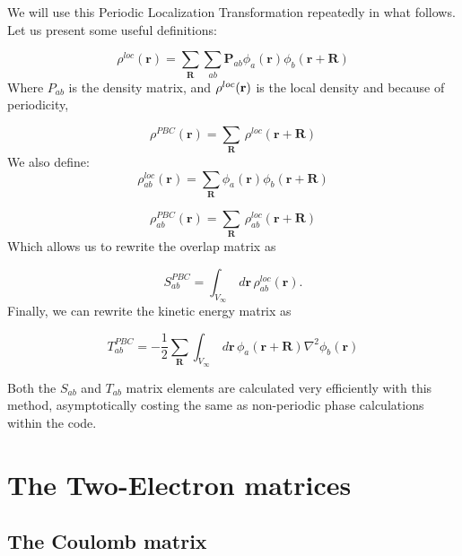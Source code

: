 \commentoutA{\documentclass[prb,aps,twocolumn,showpacs,twocolumngrid,superbib]{revtex4}}
\begin{document}
We will use this Periodic Localization Transformation repeatedly
in what follows. Let us present some useful definitions:

\begin{equation}
\label{rho_loc}
\rho ^{loc}({\mathbf{r}})=\sum _{\mathbf{R}}\sum _{ab}{\mathbf{P}}_{ab}\phi _{a}
({\mathbf{r}})\phi _{b}({\mathbf{r}+\mathbf{R}})
\end{equation}
Where $P_{ab}$ is the density matrix, and $\rho^{loc}({\bf r})$ is the local density
and because of periodicity,

\begin{equation}
\label{rho_pbc}
\rho ^{PBC}({\mathbf{r}})=\sum _{\mathbf{R}}\, \rho ^{loc}({\mathbf{r}+\mathbf{R}})
\end{equation}
We also define:\begin{equation}
\label{rho_loc_ab}
\rho _{ab}^{loc}({\mathbf{r}})=\sum _{\mathbf{R}}\phi _{a}({\mathbf{r}})\phi _{b}
({\mathbf{r}+\mathbf{R}})
\end{equation}


\begin{equation}
\label{rho_pbc_ab}
\rho _{ab}^{PBC}({\mathbf{r}})=\sum _{\mathbf{R}}\, \rho _{ab}^{loc}({\mathbf{r}+
\mathbf{R}})
\end{equation}
Which allows us to rewrite the overlap matrix as

\begin{equation}
\label{Sab_pbc_3}
S_{ab}^{PBC}=\int _{V_{\infty }}\, d{\mathbf{r}}\, \rho ^{loc}_{ab}({\mathbf{r}}).
\end{equation}
Finally, we can rewrite the kinetic energy matrix as

\begin{equation}
\label{Tab_pbc}
T^{PBC}_{ab}=-\frac{1}{2}\sum _{\mathbf{R}}\int _{V_{\infty }}\, d{\mathbf{r}}\, 
\phi _{a}({\mathbf{r}+\mathbf{R}})\nabla ^{2}\phi _{b}({\mathbf{r}})
\end{equation}

Both the $S_{ab}$ and $T_{ab}$ matrix elements are calculated very efficiently
with this method, asymptotically costing the same as non-periodic phase calculations
within the code.



\section{The Two-Electron matrices}


\subsection{The Coulomb matrix}
\end{document}
